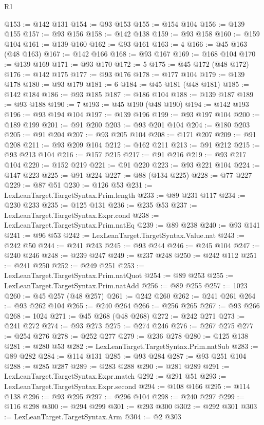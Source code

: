 \begin{lexlean}{R1}
\begin{coremodule}
@153 := @142 @131
@154 := @93 @153
@155 := @154 @104
@156 := @139 @155
@157 := @93 @156
@158 := @142 @138
@159 := @93 @158
@160 := @159 @104
@161 := @139 @160
@162 := @93 @161
@163 := 4
@166 := @45 @163 (@48 @163)
@167 := @142 @166
@168 := @93 @167
@169 := @168 @104
@170 := @139 @169
@171 := @93 @170
@172 := 5
@175 := @45 @172 (@48 @172)
@176 := @142 @175
@177 := @93 @176
@178 := @177 @104
@179 := @139 @178
@180 := @93 @179
@181 := 6
@184 := @45 @181 (@48 @181)
@185 := @142 @184
@186 := @93 @185
@187 := @186 @104
@188 := @139 @187
@189 := @93 @188
@190 := 7
@193 := @45 @190 (@48 @190)
@194 := @142 @193
@196 := @93 @194 @104
@197 := @139 @196
@199 := @93 @197 @104
@200 := @189 @199
@201 := @91 @200
@203 := @93 @201 @104
@204 := @180 @203
@205 := @91 @204
@207 := @93 @205 @104
@208 := @171 @207
@209 := @91 @208
@211 := @93 @209 @104
@212 := @162 @211
@213 := @91 @212
@215 := @93 @213 @104
@216 := @157 @215
@217 := @91 @216
@219 := @93 @217 @104
@220 := @152 @219
@221 := @91 @220
@223 := @93 @221 @104
@224 := @147 @223
@225 := @91 @224
@227 := @88 (@134 @225)
@228 := @77 @227
@229 := @87 @51
@230 := @126 @53
@231 := LexLeanTarget.TargetSyntax.Prim.length
@233 := @89 @231 @117
@234 := @230 @233
@235 := @125 @131
@236 := @235 @53
@237 := LexLeanTarget.TargetSyntax.Expr.cond
@238 := LexLeanTarget.TargetSyntax.Prim.natEq
@239 := @89 @238
@240 := @93 @141
@241 := @96 @53
@242 := LexLeanTarget.TargetSyntax.Value.nat
@243 := @242 @50
@244 := @241 @243
@245 := @93 @244
@246 := @245 @104
@247 := @240 @246
@248 := @239 @247
@249 := @237 @248
@250 := @242 @112
@251 := @241 @250
@252 := @249 @251
@253 := LexLeanTarget.TargetSyntax.Prim.natQuot
@254 := @89 @253
@255 := LexLeanTarget.TargetSyntax.Prim.natAdd
@256 := @89 @255
@257 := 1023
@260 := @45 @257 (@48 @257)
@261 := @242 @260
@262 := @241 @261
@264 := @93 @262 @104
@265 := @240 @264
@266 := @256 @265
@267 := @93 @266
@268 := 1024
@271 := @45 @268 (@48 @268)
@272 := @242 @271
@273 := @241 @272
@274 := @93 @273
@275 := @274 @246
@276 := @267 @275
@277 := @254 @276
@278 := @252 @277
@279 := @236 @278
@280 := @125 @138
@281 := @280 @53
@282 := LexLeanTarget.TargetSyntax.Prim.natSub
@283 := @89 @282
@284 := @114 @131
@285 := @93 @284
@287 := @93 @251 @104
@288 := @285 @287
@289 := @283 @288
@290 := @281 @289
@291 := LexLeanTarget.TargetSyntax.Expr.match
@292 := @291 @51
@293 := LexLeanTarget.TargetSyntax.Expr.second
@294 := @108 @166
@295 := @114 @138
@296 := @93 @295
@297 := @296 @104
@298 := @240 @297
@299 := @116 @298
@300 := @294 @299
@301 := @293 @300
@302 := @292 @301
@303 := LexLeanTarget.TargetSyntax.Arm
@304 := @2 @303

\end{coremodule}
\end{lexlean}
